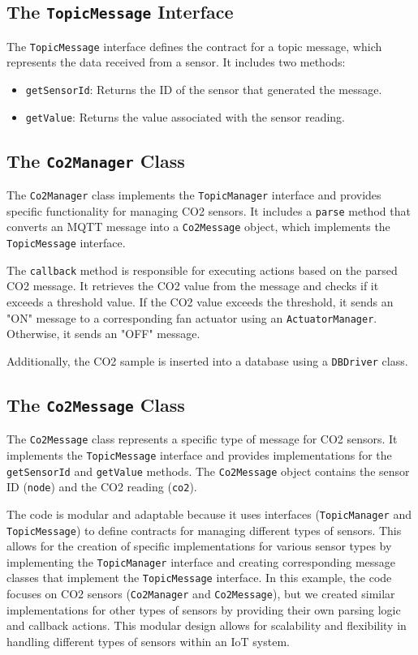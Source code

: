 \documentclass[parskip=full]{report}
\begin{document}
	\subsection{The \texttt{TopicMessage} Interface}
	
	The \texttt{TopicMessage} interface defines the contract for a topic message, which represents the data received from a sensor. It includes two methods:
	
	\begin{itemize}
		\item \texttt{getSensorId}: Returns the ID of the sensor that generated the message.
		\item \texttt{getValue}: Returns the value associated with the sensor reading.
	\end{itemize}
	
	\subsection{The \texttt{Co2Manager} Class}
	
	The \texttt{Co2Manager} class implements the \texttt{TopicManager} interface and provides specific functionality for managing CO2 sensors. It includes a \texttt{parse} method that converts an MQTT message into a \texttt{Co2Message} object, which implements the \texttt{TopicMessage} interface.
	
	The \texttt{callback} method is responsible for executing actions based on the parsed CO2 message. It retrieves the CO2 value from the message and checks if it exceeds a threshold value. If the CO2 value exceeds the threshold, it sends an "ON" message to a corresponding fan actuator using an \texttt{ActuatorManager}. Otherwise, it sends an "OFF" message.
	
	Additionally, the CO2 sample is inserted into a database using a \texttt{DBDriver} class.
	
	\subsection{The \texttt{Co2Message} Class}
	
	The \texttt{Co2Message} class represents a specific type of message for CO2 sensors. It implements the \texttt{TopicMessage} interface and provides implementations for the \texttt{getSensorId} and \texttt{getValue} methods. The \texttt{Co2Message} object contains the sensor ID (\texttt{node}) and the CO2 reading (\texttt{co2}).
	
	The code is modular and adaptable because it uses interfaces (\texttt{TopicManager} and \texttt{TopicMessage}) to define contracts for managing different types of sensors. This allows for the creation of specific implementations for various sensor types by implementing the \texttt{TopicManager} interface and creating corresponding message classes that implement the \texttt{TopicMessage} interface. In this example, the code focuses on CO2 sensors (\texttt{Co2Manager} and \texttt{Co2Message}), but we created similar implementations for other types of sensors by providing their own parsing logic and callback actions. This modular design allows for scalability and flexibility in handling different types of sensors within an IoT system.
	
\end{document}
